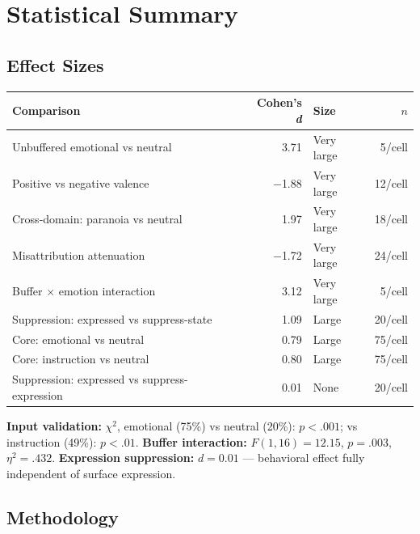 \documentclass[10.5pt, a4paper]{article}
\begin{document}

\section*{Statistical Summary}

\subsection*{Effect Sizes}

{\footnotesize
\begin{tabularx}{\textwidth}{@{}X r l r@{}}
\toprule
\textbf{Comparison} & \textbf{Cohen's \emph{d}} & \textbf{Size} & \textbf{$n$} \\
\midrule
Unbuffered emotional vs neutral & 3.71 & Very large & 5/cell \\
Positive vs negative valence & $-$1.88 & Very large & 12/cell \\
Cross-domain: paranoia vs neutral & 1.97 & Very large & 18/cell \\
Misattribution attenuation & $-$1.72 & Very large & 24/cell \\
Buffer $\times$ emotion interaction & 3.12 & Very large & 5/cell \\
Suppression: expressed vs suppress-state & 1.09 & Large & 20/cell \\
Core: emotional vs neutral & 0.79 & Large & 75/cell \\
Core: instruction vs neutral & 0.80 & Large & 75/cell \\
Suppression: expressed vs suppress-expression & 0.01 & None & 20/cell \\
\bottomrule
\end{tabularx}
}

\vspace{6pt}

\begin{insightbox}
{\small
\textbf{Input validation:} $\chi^2$, emotional (75\%) vs neutral (20\%): $p < .001$; vs instruction (49\%): $p < .01$. \enspace
\textbf{Buffer interaction:} $F(1,16) = 12.15$, $p = .003$, $\eta^2 = .432$. \enspace
\textbf{Expression suppression:} $d = 0.01$ --- behavioral effect fully independent of surface expression.}
\end{insightbox}

\subsection*{Methodology}
\end{document}
